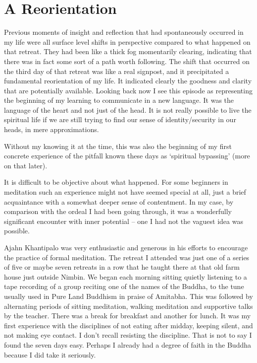 \chapter{A Reorientation}

Previous moments of insight and reflection that had spontaneously
occurred in my life were all surface level shifts in perspective
compared to what happened on that retreat. They had been like a thick
fog momentarily clearing, indicating that there was in fact some sort of
a path worth following. The shift that occurred on the third day of that
retreat was like a real signpost, and it precipitated a fundamental
reorientation of my life. It indicated clearly the goodness and clarity
that are potentially available. Looking back now I see this episode as
representing the beginning of my learning to communicate in a new
language. It was the language of the heart and not just of the head. It
is not really possible to live the spiritual life if we are still trying
to find our sense of identity/security in our heads, in mere
approximations.

Without my knowing it at the time, this was also the beginning of my
first concrete experience of the pitfall known these days as `spiritual
bypassing' (more on that later).

It is difficult to be objective about what happened. For some beginners
in meditation such an experience might not have seemed special at all,
just a brief acquaintance with a somewhat deeper sense of contentment.
In my case, by comparison with the ordeal I had been going through, it
was a wonderfully significant encounter with inner potential -- one I
had not the vaguest idea was possible.

Ajahn Khantipalo was very enthusiastic and generous in his efforts to
encourage the practice of formal meditation. The retreat I attended was
just one of a series of five or maybe seven retreats in a row that he
taught there at that old farm house just outside Nimbin. We began each
morning sitting quietly listening to a tape recording of a group
reciting one of the names of the Buddha, to the tune usually used in
Pure Land Buddhism in praise of Amitabha. This was followed
by alternating periods of sitting meditation, walking meditation and
supportive talks by the teacher. There was a break for breakfast and
another for lunch. It was my first experience with the disciplines of
not eating after midday, keeping silent, and not making eye contact. I
don't recall resisting the discipline. That is not to say I found the
seven days easy. Perhaps I already had a degree of faith in the Buddha
because I did take it seriously.

